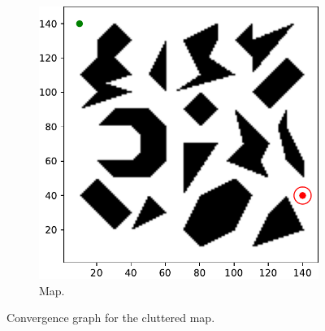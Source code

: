 \documentclass{beamer}
\begin{document}
\begin{frame}
\begin{figure}[!ht]
\begin{subfigure}[b]{0.49\textwidth}
			\includegraphics[width=\textwidth]{figChap5/Maze_clutter_ticks.pdf}
			\caption{Map.} 
		\end{subfigure}   
		\caption{Convergence graph for the cluttered map.} 
	\end{figure}
\end{frame}	
\end{document}
